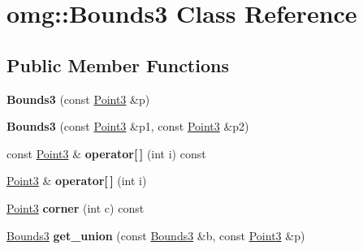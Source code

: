 \hypertarget{classomg_1_1_bounds3}{}\section{omg\+::Bounds3 Class Reference}
\label{classomg_1_1_bounds3}
\subsection*{Public Member Functions}
\begin{DoxyCompactItemize}
\item 
\mbox{\label{classomg_1_1_bounds3_afb09713ba251a26880d78ccf0ae6d8bf}} 
{\bfseries Bounds3} (const \mbox{\hyperlink{namespaceomg_af85242d35fdacf829d32a6f9b95f3e35}{Point3}} \&p)
\item 
\mbox{\label{classomg_1_1_bounds3_aca77d4011d6b9b6d703181a063163882}} 
{\bfseries Bounds3} (const \mbox{\hyperlink{namespaceomg_af85242d35fdacf829d32a6f9b95f3e35}{Point3}} \&p1, const \mbox{\hyperlink{namespaceomg_af85242d35fdacf829d32a6f9b95f3e35}{Point3}} \&p2)
\item 
\mbox{\label{classomg_1_1_bounds3_a220e61685965a811f5668a31adde049d}} 
const \mbox{\hyperlink{namespaceomg_af85242d35fdacf829d32a6f9b95f3e35}{Point3}} \& {\bfseries operator\mbox{[}$\,$\mbox{]}} (int i) const
\item 
\mbox{\label{classomg_1_1_bounds3_a6932b466edcb431f160e17000190d08c}} 
\mbox{\hyperlink{namespaceomg_af85242d35fdacf829d32a6f9b95f3e35}{Point3}} \& {\bfseries operator\mbox{[}$\,$\mbox{]}} (int i)
\item 
\mbox{\label{classomg_1_1_bounds3_a75688eada733d87b4b81ee4551838e79}} 
\mbox{\hyperlink{namespaceomg_af85242d35fdacf829d32a6f9b95f3e35}{Point3}} {\bfseries corner} (int c) const
\item 
\mbox{\label{classomg_1_1_bounds3_a8c0ab46f99ddeb5be8529c50377b7576}} 
\mbox{\hyperlink{classomg_1_1_bounds3}{Bounds3}} {\bfseries get\+\_\+union} (const \mbox{\hyperlink{classomg_1_1_bounds3}{Bounds3}} \&b, const \mbox{\hyperlink{namespaceomg_af85242d35fdacf829d32a6f9b95f3e35}{Point3}} \&p)
\item 

\end{DoxyCompactItemize}
